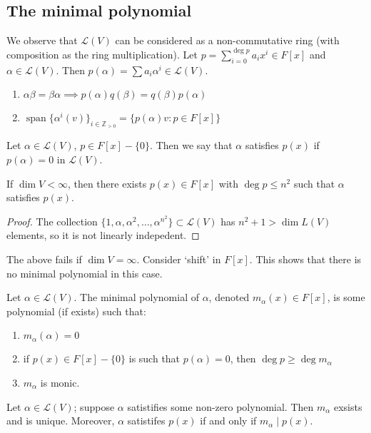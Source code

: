 \documentclass{scrartcl}
\def\le{\leqslant}
\def\ge{\geqslant}
\def\Z{\mathbb{Z}}
\def\L{\mathcal{L}}
\DeclareMathOperator{\spn}{span}  %
\begin{document}
\subsection{The minimal polynomial}
We observe that $\L(V)$ can be considered as a non-commutative ring (with composition as the ring multiplication). Let $p = \sum_{i=0}^{\deg{p}}a_ix^i \in F[x]$ and $\alpha \in \L(V)$. Then $p(\alpha) = \sum a_i \alpha^i \in \L(V)$. 
\begin{remark}
	\begin{enumerate}
		\item $\alpha \beta = \beta \alpha \implies p(\alpha)q(\beta) = q(\beta)p(\alpha)$
		\item $\spn\{\alpha^i(v)\}_{i \in \Z_{>0}} = \{p(\alpha)v: p \in F[x]\}$
	\end{enumerate}
\end{remark}
\begin{definition}
	Let $\alpha \in \L(V)$, $p \in F[x]-\{0\}$. Then we say that $\alpha$ satisfies $p(x)$ if $p(\alpha) = 0$ in $\L(V)$. 
\end{definition}
\begin{lemma}
	If $\dim{V} < \infty$, then there exists $p(x) \in F[x]$ with $\deg{p} \le n^2$ such that $\alpha$ satisfies $p(x)$.
\end{lemma}
\begin{proof}
	The collection $\{1, \alpha, \alpha^2, \dots, \alpha^{n^2}\} \subset \L(V)$ has $n^2+1 > \dim{L(V)}$ elements, so it is not linearly indepedent.
\end{proof}
\begin{remark}
	The above fails if $\dim{V} = \infty$. Consider `shift' in $F[x]$. This shows that there is no minimal polynomial in this case.
\end{remark}
\begin{definition}
	Let $\alpha \in \L(V)$. The minimal polynomial of $\alpha$, denoted $m_\alpha(x) \in F[x]$, is some polynomial (if exists) such that:
	\begin{enumerate}
		\item $m_\alpha(\alpha) = 0$
		\item if $p(x) \in F[x]-\{0\}$ is such that $p(\alpha) = 0$, then $\deg{p} \ge \deg{m_\alpha}$
		\item $m_\alpha$ is monic.
	\end{enumerate}
\end{definition}
\begin{lemma}
	Let $\alpha \in \L(V)$; suppose $\alpha$ satistifies some non-zero polynomial. Then $m_\alpha$ exsists and is unique. Moreover, $\alpha$ satistifes $p(x)$ if and only if $m_\alpha \mid p(x)$.
\end{lemma}
\end{document}
